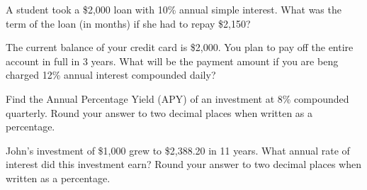 \documentclass[11pt,epsfig]{article}
\begin{document}
\newpage

\begin{problem}{25}
A student took a \$2,000 loan with 10\% annual simple interest. What was the term of the loan (in months) if she had to repay \$2,150?
\vfill
\end{problem}


\begin{problem}{25}
The current balance of your credit card is \$2,000. You plan to pay off the entire account in full in 3 years. What will be the payment amount if you are beng charged 12\% annual interest compounded daily?

\vfill
\end{problem}

\newpage



\begin{problem}{25}
Find the Annual Percentage Yield (APY) of an investment at 8\% compounded quarterly. Round your answer to two decimal places when written as a percentage.
\vfill
\end{problem}

\begin{problem}{25}
John's investment of \$1,000 grew to \$2,388.20 in 11 years. What annual rate of interest did this investment earn? Round your answer to two decimal places when written as a percentage.

\vfill
\end{problem}


\showpoints
\end{document}
